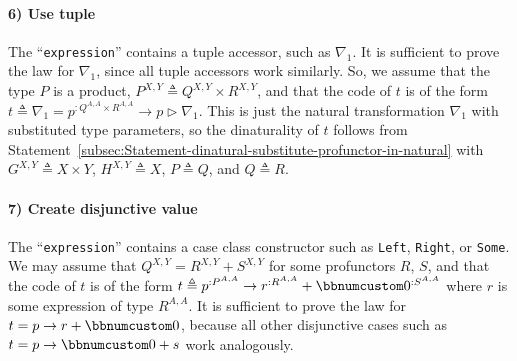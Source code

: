 \paragraph{6) Use tuple }

The \textsf{``}\lstinline!expression!\textsf{''} contains a tuple accessor, such
as $\nabla_{1}$. It is sufficient to prove the law for $\nabla_{1}$,
since all tuple accessors work similarly. So, we assume that the type
$P$ is a product, $P^{X,Y}\triangleq Q^{X,Y}\times R^{X,Y}$, and
that the code of $t$ is of the form $t\triangleq\nabla_{1}=p^{:Q^{A,A}\times R^{A,A}}\rightarrow p\triangleright\nabla_{1}$.
This is just the natural transformation $\nabla_{1}$ with substituted
type parameters, so the dinaturality of $t$ follows from Statement~\ref{subsec:Statement-dinatural-substitute-profunctor-in-natural}
with $G^{X,Y}\triangleq X\times Y$, $H^{X,Y}\triangleq X$, $P\triangleq Q$,
and $Q\triangleq R$.

\paragraph{7) Create disjunctive value }

The \textsf{``}\lstinline!expression!\textsf{''} contains a case class constructor
such as \lstinline!Left!, \lstinline!Right!, or \lstinline!Some!.
We may assume that $Q^{X,Y}=R^{X,Y}+S^{X,Y}$ for some profunctors
$R$, $S$, and that the code of $t$ is of the form $t\triangleq p^{:P^{A,A}}\rightarrow r^{:R^{A,A}}+\bbnum 0^{:S^{A,A}}$
where $r$ is some expression of type $R^{A,A}$. It is sufficient
to prove the law for $t=p\rightarrow r+\bbnum 0$, because all other
disjunctive cases such as $t=p\rightarrow\bbnum 0+s$ work analogously.

